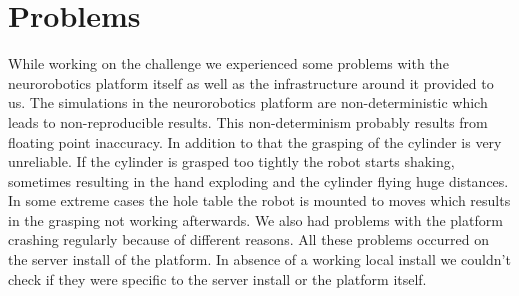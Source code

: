\section{Problems}\label{sec:problems}
While working on the challenge we experienced some problems with the neurorobotics platform itself as well as the infrastructure around it provided to us.
The simulations in the neurorobotics platform are non-deterministic which leads to non-reproducible results.
This non-determinism probably results from floating point inaccuracy.
In addition to that the grasping of the cylinder is very unreliable.
If the cylinder is grasped too tightly the robot starts shaking, sometimes resulting in the hand exploding and the cylinder flying huge distances.
In some extreme cases the hole table the robot is mounted to moves which results in the grasping not working afterwards.
We also had problems with the platform crashing regularly because of different reasons.
All these problems occurred on the server install of the platform.
In absence of a working local install we couldn't check if they were specific to the server install or the platform itself.